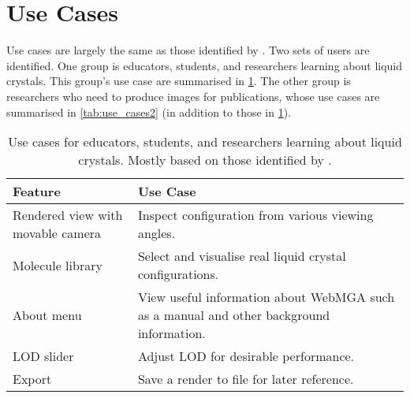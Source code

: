 \section{Use Cases}
Use cases are largely the same as those identified by \textcite{Battistini_2021}. Two sets of users are identified. One group is educators, students, and researchers learning about liquid crystals. This group's use case are summarised in \cref{tab:use_cases}. The other group is researchers who need to produce images for publications, whose use cases are summarised in \cref{tab:use_cases2} (in addition to those in \cref{tab:use_cases}).
\begin{table}
  \begin{center}
  \begin{adjustbox}{width=\textwidth}
    \begin{tabular}{ll}
    \hline\hline
       \textbf{Feature} & \textbf{Use Case} \\
       \hline
       Rendered view with movable camera & Inspect configuration from various viewing angles. \\
       Molecule library & Select and visualise real liquid crystal configurations. \\
       About menu & View useful information about WebMGA such as a manual and other background information. \\
       LOD slider & Adjust LOD for desirable performance. \\
       Export & Save a render to file for later reference. \\
       \hline\hline
    \end{tabular}
    \end{adjustbox}
  \end{center}
  \caption{Use cases for educators, students, and researchers learning about liquid crystals. Mostly based on those identified by \textcite{Battistini_2021}.}
  \label{tab:use_cases}
\end{table}

